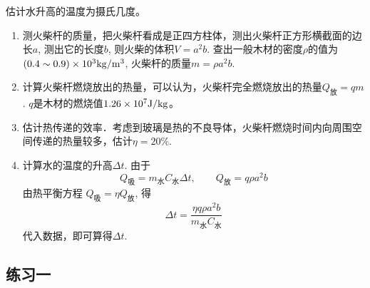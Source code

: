 估计水升高的温度为摄氏几度。

\begin{enumerate}
    \item 测火柴杆的质量，把火柴杆看成是正四方柱体，测出火柴杆正方形横截面的边长$a$, 测出它的长度$b$, 则火柴的体积$V=a^2b$. 查出一般木材的密度$\rho$的值为$(0.4\sim 0.9)\times10^3{\rm kg/m^3}$, 火柴杆的质量$m=\rho a^2b$.
    \item 计算火柴杆燃烧放出的热量，可以认为，火柴杆完全燃烧放出的热量$Q_{\text{放}}=qm$. $q$是木材的燃烧值$1.26\times10^7{\rm J/kg}$。
    \item 估计热传递的效率．考虑到玻璃是热的不良导体，火柴杆燃烧时间内向周围空间传递的热量较多，估计$\eta=20\%$.
    \item 计算水的温度的升高$\Delta t$. 由于
    \[Q_{\text{吸}}=m_{\text{水}}C_{\text{水}}\Delta t,\qquad Q_{\text{放}}=q\rho a^2b\]
    由热平衡方程 $Q_{\text{吸}}=\eta Q_{\text{放}}$, 得
    \[\Delta t=\frac{\eta q\rho a^2b}{m_{\text{水}}C_{\text{水}}}\]
    代入数据，即可算得$\Delta t$.
\end{enumerate}


\subsection{练习一}

